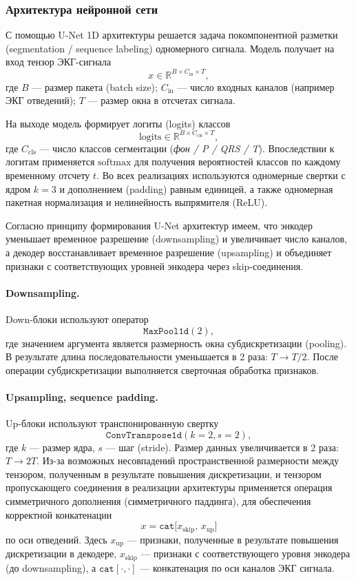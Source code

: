 \documentclass[11pt, oneside, a4paper]{article}
\begin{document}
\subsubsection{Архитектура нейронной сети}

С помощью U-Net 1D архитектуры решается задача покомпонентной разметки (segmentation / sequence labeling) одномерного сигнала. Модель получает на вход тензор ЭКГ-сигнала
\[
x \in \mathbb{R}^{B \times C_{\text{in}} \times T},
\]
где $B$ --- размер пакета (batch size); $C_{\text{in}}$ --- число входных каналов (например ЭКГ отведений);
$T$ --- размер окна в отсчетах сигнала.

На выходе модель формирует логиты (logits) классов
\[
\text{logits} \in \mathbb{R}^{B \times C_{\text{cls}} \times T},
\]
где $C_{\text{cls}}$ --- число классов сегментации (\textit{фон / P / QRS / T}).
Впоследствии к логитам применяется $\mathrm{softmax}$ для получения вероятностей классов по каждому временному отсчету $t$.
Во всех реализациях используются одномерные свертки с ядром $k=3$ и дополнением (padding) равным единицей, а также одномерная пакетная нормализация и нелинейность выпрямителя (ReLU).

Согласно принципу формирования U-Net архитектур имеем, что энкодер уменьшает временное разрешение (downsampling) и увеличивает число каналов, а декодер восстанавливает временное разрешение (upsampling) и объединяет признаки с соответствующих уровней энкодера через skip-соединения.

\paragraph{Downsampling.}
Down-блоки используют оператор
\[
\texttt{MaxPool1d}(2),
\]
где значением аргумента является размерность окна субдискретизации (pooling). В результате длина последовательности уменьшается в 2 раза: $T \rightarrow T/2$. После операции субдискретизации выполняется сверточная обработка признаков.

\paragraph{Upsampling, sequence padding.}
Up-блоки используют транспонированную свертку
\[
\texttt{ConvTranspose1d}(k{=}2, s{=}2),
\]
где $k$ --- размер ядра, $s$ --- шаг (stride). Размер данных увеличивается в 2 раза: $T \rightarrow 2T$.
Из-за возможных несовпадений пространственной размерности между тензором, полученным в результате повышения дискретизации, и тензором пропускающего соединения в реализации архитектуры применяется операция симметричного дополнения (симметричного паддинга), для обеспечения корректной конкатенации
\[
x = \texttt{cat}\big[x_{\text{skip}},\, x_{\text{up}}\big]
\]
по оси отведений. Здесь $x_{\text{up}}$ --- признаки, полученные в результате повышения дискретизации в декодере, $x_{\text{skip}}$ --- признаки с соответствующего уровня энкодера
(до downsampling), а $\texttt{cat}[\cdot,\cdot]$ --- конкатенация по оси каналов ЭКГ сигнала.
\end{document}
